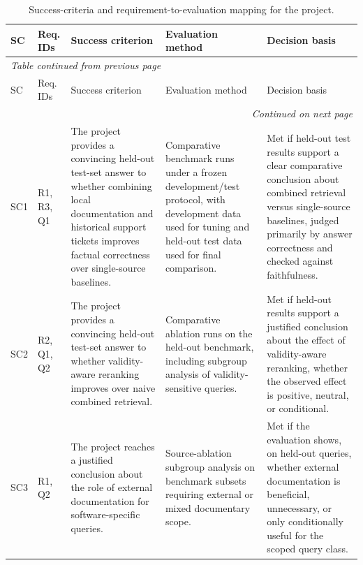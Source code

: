 \begin{longtable}{p{0.9cm} p{1.7cm} p{4.2cm} p{4.0cm} p{4.3cm}}
\caption{Success-criteria and requirement-to-evaluation mapping for the project.}
\label{tab:requirement-evaluation-mapping} \\

\hline
SC & Req. IDs & Success criterion & Evaluation method & Decision basis \\
\hline
\endfirsthead

\multicolumn{5}{l}{\textit{Table \thetable{} continued from previous page}} \\
\hline
SC & Req. IDs & Success criterion & Evaluation method & Decision basis \\
\hline
\endhead

\hline
\multicolumn{5}{r}{\textit{Continued on next page}} \\
\endfoot

\hline
\endlastfoot

SC1 &
R1, R3, Q1 &
The project provides a convincing held-out test-set answer to whether combining local documentation and historical support tickets improves factual correctness over single-source baselines. &
Comparative benchmark runs under a frozen development/test protocol, with development data used for tuning and held-out test data used for final comparison. &
Met if held-out test results support a clear comparative conclusion about combined retrieval versus single-source baselines, judged primarily by answer correctness and checked against faithfulness. \\

SC2 &
R2, Q1, Q2 &
The project provides a convincing held-out test-set answer to whether validity-aware reranking improves over naive combined retrieval. &
Comparative ablation runs on the held-out benchmark, including subgroup analysis of validity-sensitive queries. &
Met if held-out results support a justified conclusion about the effect of validity-aware reranking, whether the observed effect is positive, neutral, or conditional. \\

SC3 &
R1, Q2 &
The project reaches a justified conclusion about the role of external documentation for software-specific queries. &
Source-ablation subgroup analysis on benchmark subsets requiring external or mixed documentary scope. &
Met if the evaluation shows, on held-out queries, whether external documentation is beneficial, unnecessary, or only conditionally useful for the scoped query class. \\


\end{longtable}
